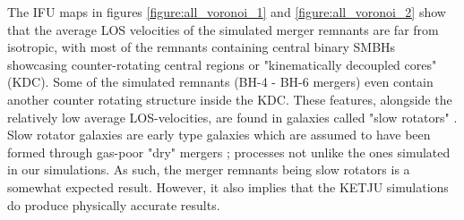 \documentclass[english, oneside]{HYgradu}
\begin{document}
The IFU maps in figures \ref{figure:all_voronoi_1} and \ref{figure:all_voronoi_2} show that the average LOS velocities of the simulated merger remnants are far from isotropic, with most of the remnants containing central binary SMBHs showcasing counter-rotating central regions or "kinematically decoupled cores" (KDC). Some of the simulated remnants (BH-4 - BH-6 mergers) even contain another counter rotating structure inside the KDC. These features, alongside the relatively low average LOS-velocities, are found in galaxies called "slow rotators" \citep{Emsellem2007}. Slow rotator galaxies are early type galaxies which are assumed to have been formed through gas-poor "dry" mergers \citep{Emsellem2007, Cappellari2007}; processes not unlike the ones simulated in our simulations. As such, the merger remnants being slow rotators is a somewhat expected result. However, it also implies that the KETJU simulations do produce physically accurate results.
\end{document}
